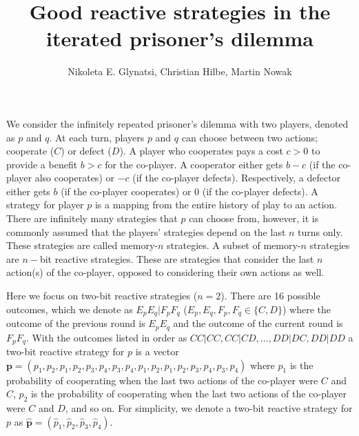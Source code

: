 \documentclass{article}
\title{\vspace{-2cm} Good reactive strategies in the iterated prisoner's dilemma}
\author{Nikoleta E. Glynatsi, Christian Hilbe, Martin Nowak}
\date{}
\theoremstyle{definition}
\begin{document}
\maketitle

\vspace{-.5cm}

We consider the infinitely repeated prisoner's dilemma with two players, denoted
as \(p\) and \(q\). At each turn, players \(p\) and \(q\) can choose between two
actions; cooperate (\(C\)) or defect (\(D\)). A player who cooperates pays a
cost \(c > 0\) to provide a benefit \(b > c\) for the co-player. A cooperator
either gets \(b - c\) (if the co-player also cooperates) or \(-c\) (if the
co-player defects). Respectively, a defector either gets \(b\) (if the co-player
cooperates) or 0 (if the co-player defects). A strategy for player \(p\) is a
mapping from the entire history of play to an action. There are infinitely many
strategies that \(p\) can choose from, however, it is commonly assumed that the
players' strategies depend on the last \(n\) turns only. These strategies are
called memory-\(n\) strategies. A subset of memory-\(n\) strategies are
\(n-\)bit reactive strategies. These are strategies that consider the last \(n\)
action(s) of the co-player, opposed to considering their own actions as well.

Here we focus on two-bit reactive strategies (\(n=2\)).
There are 16 possible outcomes, which we denote as \(E_p
E_q | F_p F_q\) (\(E_p, E_q, F_p, F_q \in \{C, D\}\)) where the outcome of the
previous round is \(E_p E_q\) and the outcome of the current round is \(F_p
F_q\). With the outcomes listed in order as \(CC|CC, CC|CD, \dots, DD|DC,
DD|DD\) a two-bit reactive strategy for \(p\) is a vector \(\mathbf{p} = (p_1,
p_2, p_1, p_2, p_3, p_4, p_3, p_4, p_1, p_2, p_1, p_2, p_3, p_4, \allowbreak
p_3, p_4)\) where \(p_1\) is the probability of cooperating when the last two
actions of the co-player were \(C\) and \(C\), \(p_2\) is the probability of
cooperating when the last two actions of the co-player were \(C\) and \(D\), and
so on. For simplicity, we denote a two-bit reactive strategy for \(p\) as
\(\mathbf{\hat{p}} = (\hat{p}_1, \hat{p}_2, \hat{p}_3, \hat{p}_4)\).

\end{document}
